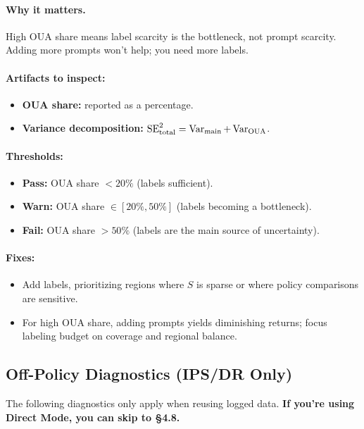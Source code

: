 \paragraph{Why it matters.} High OUA share means label scarcity is the bottleneck, not prompt scarcity. Adding more prompts won't help; you need more labels.

\paragraph{Artifacts to inspect:}
\begin{itemize}
\item \textbf{OUA share:} reported as a percentage.
\item \textbf{Variance decomposition:} $\operatorname{SE}^2_{\text{total}} = \operatorname{Var}_{\text{main}} + \operatorname{Var}_{\text{OUA}}$.
\end{itemize}

\paragraph{Thresholds:}
\begin{itemize}
\item \textbf{Pass:} OUA share $< 20\%$ (labels sufficient).
\item \textbf{Warn:} OUA share $\in [20\%, 50\%]$ (labels becoming a bottleneck).
\item \textbf{Fail:} OUA share $> 50\%$ (labels are the main source of uncertainty).
\end{itemize}

\paragraph{Fixes:}
\begin{itemize}
\item Add labels, prioritizing regions where $S$ is sparse or where policy comparisons are sensitive.
\item For high OUA share, adding prompts yields diminishing returns; focus labeling budget on coverage and regional balance.
\end{itemize}

\subsection*{Off-Policy Diagnostics (IPS/DR Only)}

The following diagnostics only apply when reusing logged data. \textbf{If you're using Direct Mode, you can skip to §4.8.}

